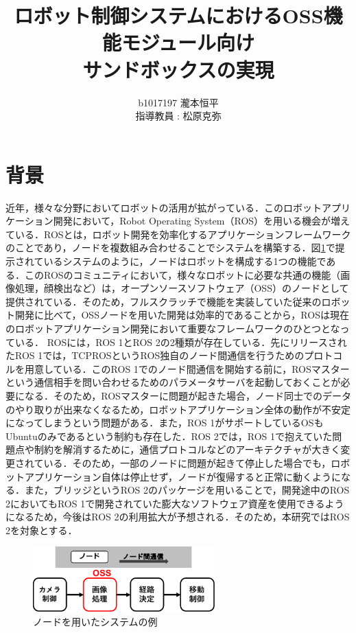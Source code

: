 \documentclass[11pt]{ujarticle} %
\author{
b1017197 瀧本恒平\\指導教員 : 松原克弥
}
\title{ロボット制御システムにおけるOSS機能モジュール向け\\サンドボックスの実現}
\begin{document}
\maketitle

\section{背景}
近年，様々な分野においてロボットの活用が拡がっている\cite{Pepper}\cite{RoBoHoN}．このロボットアプリケーション開発において，Robot Operating System（ROS）を用いる機会が増えている．ROSとは，ロボット開発を効率化するアプリケーションフレームワークのことであり，ノードを複数組み合わせることでシステムを構築する．図\ref{fig:nodeExp}で提示されているシステムのように，ノードはロボットを構成する1つの機能である．このROSのコミュニティにおいて，様々なロボットに必要な共通の機能（画像処理\cite{ROSexample}，顔検出\cite{facedetector}など）は，オープンソースソフトウェア（OSS）のノードとして提供されている．そのため，フルスクラッチで機能を実装していた従来のロボット開発に比べて，OSSノードを用いた開発は効率的であることから，ROSは現在のロボットアプリケーション開発において重要なフレームワークのひとつとなっている．
ROSには，ROS 1とROS 2の2種類が存在している．先にリリースされたROS 1では，TCPROSというROS独自のノード間通信を行うためのプロトコルを用意している．このROS 1でのノード間通信を開始する前に，ROSマスターという通信相手を問い合わせるためのパラメータサーバを起動しておくことが必要になる．そのため，ROSマスターに問題が起きた場合，ノード同士でのデータのやり取りが出来なくなるため，ロボットアプリケーション全体の動作が不安定になってしまうという問題がある．また，ROS 1がサポートしているOSもUbuntuのみであるという制約も存在した．ROS 2では，ROS 1で抱えていた問題点や制約を解消するために，通信プロトコルなどのアーキテクチャが大きく変更されている．そのため，一部のノードに問題が起きて停止した場合でも，ロボットアプリケーション自体は停止せず，ノードが復帰すると正常に動くようになる．また，ブリッジというROS 2のパッケージを用いることで，開発途中のROS 2においてもROS 1で開発されていた膨大なソフトウェア資産を使用できるようになるため，今後はROS 2の利用拡大が予想される．そのため，本研究ではROS 2を対象とする．

\begin{figure}[h]
   \centering
   \includegraphics[width=7cm]{img/nodeExp.pdf}
   \caption{ノードを用いたシステムの例}
   \label{fig:nodeExp}
\end{figure}
\end{document}
